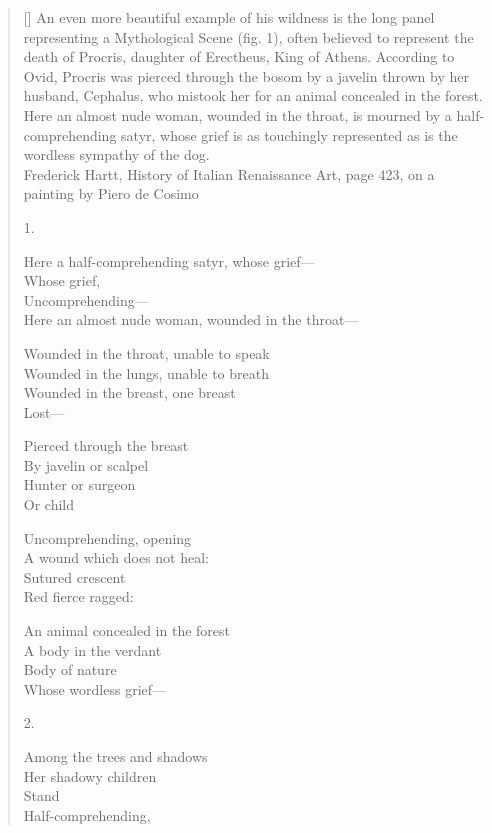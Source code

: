 \label{ch:oftenbelieved}
\settowidth{\versewidth}{Here an almost nude woman, wounded in the throat---}
\begin{verse}[\versewidth]
An even more beautiful example of his wildness is the long panel representing a Mythological Scene (fig. 1), often believed to represent the death of Procris, daughter of Erectheus, King of Athens. According to Ovid, Procris was pierced through the bosom by a javelin thrown by her husband, Cephalus, who mistook her for an animal concealed in the forest.  Here an almost nude woman, wounded in the throat, is mourned by a half-comprehending satyr, whose grief is as touchingly represented as is the wordless sympathy of the dog.\\
Frederick Hartt, History of Italian Renaissance Art, page 423, on a painting by Piero de Cosimo

1.

Here a half-comprehending satyr, whose grief---\\
Whose grief,\\
Uncomprehending---\\
Here an almost nude woman, wounded in the throat---

Wounded in the throat, unable to speak\\
Wounded in the lungs, unable to breath\\
Wounded in the breast, one breast\\
Lost---

Pierced through the breast\\
By javelin or scalpel\\
Hunter or surgeon\\
Or child

Uncomprehending, opening\\
A wound which does not heal:\\
Sutured crescent\\
Red    fierce   ragged:

An animal concealed in the forest\\
A body in the verdant\\
Body of nature\\
Whose wordless grief---

2.

Among the trees and shadows\\
Her shadowy children\\
Stand\\
Half-comprehending,


\end{verse}
